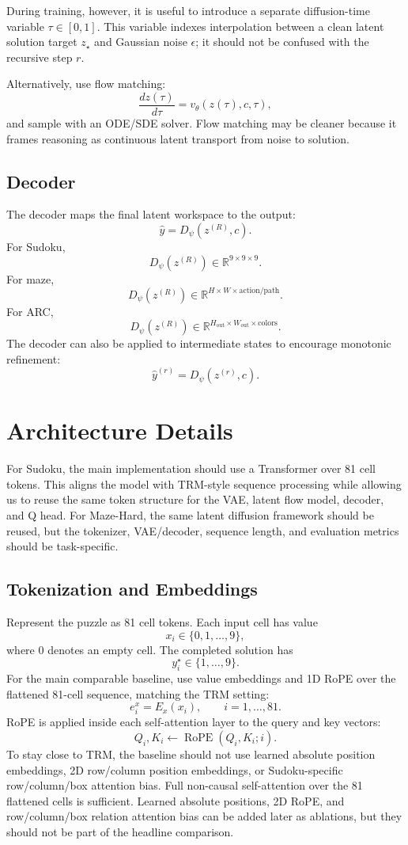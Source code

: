 \documentclass[11pt]{article}
\begin{document}
During training, however, it is useful to introduce a separate diffusion-time variable \(\tau\in[0,1]\). This variable indexes interpolation between a clean latent solution target \(z_\star\) and Gaussian noise \(\epsilon\); it should not be confused with the recursive step \(r\).

Alternatively, use flow matching:
\[
    \frac{d z(\tau)}{d\tau}=v_\theta(z(\tau),c,\tau),
\]
and sample with an ODE/SDE solver. Flow matching may be cleaner because it frames reasoning as continuous latent transport from noise to solution.

\subsection{Decoder}
The decoder maps the final latent workspace to the output:
\[
    \hat y = D_\psi(z^{(R)},c).
\]
For Sudoku,
\[
    D_\psi(z^{(R)})\in\mathbb R^{9\times 9\times 9}.
\]
For maze,
\[
    D_\psi(z^{(R)})\in\mathbb R^{H\times W\times \mathrm{action/path}}.
\]
For ARC,
\[
    D_\psi(z^{(R)})\in\mathbb R^{H_{\mathrm{out}}\times W_{\mathrm{out}}\times \mathrm{colors}}.
\]
The decoder can also be applied to intermediate states to encourage monotonic refinement:
\[
    \hat y^{(r)} = D_\psi(z^{(r)},c).
\]

\section{Architecture Details}

For Sudoku, the main implementation should use a Transformer over 81 cell tokens. This aligns the model with TRM-style sequence processing while allowing us to reuse the same token structure for the VAE, latent flow model, decoder, and Q head. For Maze-Hard, the same latent diffusion framework should be reused, but the tokenizer, VAE/decoder, sequence length, and evaluation metrics should be task-specific.

\subsection{Tokenization and Embeddings}

Represent the puzzle as 81 cell tokens. Each input cell has value
\[
    x_i\in\{0,1,\dots,9\},
\]
where \(0\) denotes an empty cell. The completed solution has
\[
    y_i^\star\in\{1,\dots,9\}.
\]
For the main comparable baseline, use value embeddings and 1D RoPE over the flattened 81-cell sequence, matching the TRM setting:
\[
    e_i^x = E_x(x_i),
    \qquad
    i=1,\dots,81.
\]
RoPE is applied inside each self-attention layer to the query and key vectors:
\[
    Q_i,K_i
    \leftarrow
    \operatorname{RoPE}(Q_i,K_i;i).
\]
To stay close to TRM, the baseline should not use learned absolute position embeddings, 2D row/column position embeddings, or Sudoku-specific row/column/box attention bias. Full non-causal self-attention over the 81 flattened cells is sufficient. Learned absolute positions, 2D RoPE, and row/column/box relation attention bias can be added later as ablations, but they should not be part of the headline comparison.
\end{document}
